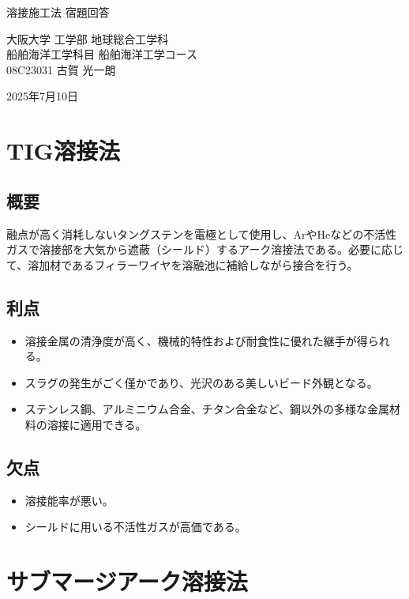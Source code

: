\documentclass[a4j]{jsarticle}
\begin{document}
\begin{center}
    {\huge 溶接施工法 宿題回答 \par}
    \vspace{1.5em}
    {\large 大阪大学 工学部 地球総合工学科 \\ 船舶海洋工学科目 船舶海洋工学コース \\ 08C23031 古賀 光一朗 \par}
    \vspace{1em}
    {\large 2025年7月10日\par}
\end{center}
\vspace{2em}

\section*{TIG溶接法}

\subsection*{概要}
融点が高く消耗しないタングステンを電極として使用し、ArやHeなどの不活性ガスで溶接部を大気から遮蔽（シールド）するアーク溶接法である。必要に応じて、溶加材であるフィラーワイヤを溶融池に補給しながら接合を行う。

\subsection*{利点}
\begin{itemize}
    \item 溶接金属の清浄度が高く、機械的特性および耐食性に優れた継手が得られる。
    \item スラグの発生がごく僅かであり、光沢のある美しいビード外観となる。
    \item ステンレス鋼、アルミニウム合金、チタン合金など、鋼以外の多様な金属材料の溶接に適用できる。
\end{itemize}

\subsection*{欠点}
\begin{itemize}
    \item 溶接能率が悪い。
    \item シールドに用いる不活性ガスが高価である。
\end{itemize}

\section*{サブマージアーク溶接法}
\end{document}
